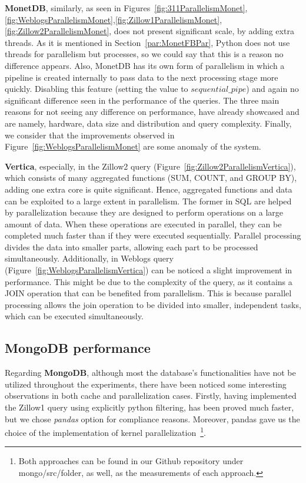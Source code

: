 \textbf{MonetDB}, similarly, as seen in Figures~\ref{fig:311ParallelismMonet},
\ref{fig:WeblogsParallelismMonet},\ref{fig:Zillow1ParallelismMonet},
\ref{fig:Zillow2ParallelismMonet}, does not present significant scale, 
by adding extra threads. 
As it is mentioned in Section~\ref{par:MonetFBPar}, Python does not use threads for 
parallelism but processes, so we could say that this is a reason no difference appears. 
Also, MonetDB has its own form of parallelism in which a pipeline is created internally
to pass data to the next processing stage more quickly. Disabling this feature (setting the 
value to $sequential\_pipe$) and again no significant difference seen in the performance of 
the queries. The three main reasons for not seeing any difference on performance, 
have already showcased and are namely, hardware, data size and distribution 
and query complexity. Finally, we consider that the improvements observed in 
Figure~\ref{fig:WeblogsParallelismMonet} are some anomaly of the system.

\textbf{Vertica}, especially, in the Zillow2 query 
(Figure~\ref{fig:Zillow2ParallelismVertica}), which consists of many aggregated functions 
(SUM, COUNT, and GROUP BY), adding one extra core is quite significant.
Hence, aggregated functions and data can be exploited to a large extent in parallelism. 
The former in SQL are helped by parallelization because they are designed to perform operations on a 
large amount of data. When these operations are executed in parallel, they can be completed 
much faster than if they were executed sequentially. Parallel processing divides the data into 
smaller parts, allowing each part to be processed simultaneously. Additionally, in Weblogs query 
(Figure~\ref{fig:WeblogsParallelismVertica}) can be noticed a slight improvement 
in performance. This might be due to the complexity of the query, as it contains a JOIN 
operation that can be benefited from parallelism. This is because parallel processing 
allows the join operation to be divided into smaller, independent tasks, which can be 
executed simultaneously.

\subsection{MongoDB performance}
Regarding \textbf{MongoDB}, although most the database's functionalities have not be utilized throughout the 
experiments, there have been noticed some interesting observations in both cache and
parallelization cases. 
Firstly, having implemented the Zillow1 query using explicitly 
python filtering, has been proved much faster, but we chose \emph{pandas} option
for compliance reasons. Moreover, pandas gave us the choice of the 
implementation of kernel parallelization~\footnote{Both approaches can be found in our Github repository
under mongo/src/folder, as well, as the measurements of each approach.}. 

